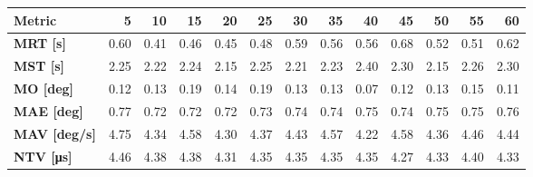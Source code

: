 \begin{tabular*}{\textwidth}{@{\extracolsep{\fill}}l|rrrrrrrrrrrr}
    \toprule
    \textbf{Metric} & \textbf{5} & \textbf{10} & \textbf{15} & \textbf{20} & \textbf{25} & \textbf{30} & \textbf{35} & \textbf{40} & \textbf{45} & \textbf{50} & \textbf{55} & \textbf{60} \\
    \midrule
    \textbf{MRT [s]} & 0.60 & 0.41 & 0.46 & 0.45 & 0.48 & 0.59 & 0.56 & 0.56 & 0.68 & 0.52 & 0.51 & 0.62 \\
    \textbf{MST [s]} & 2.25 & 2.22 & 2.24 & 2.15 & 2.25 & 2.21 & 2.23 & 2.40 & 2.30 & 2.15 & 2.26 & 2.30 \\
    \textbf{MO  [deg]} & 0.12 & 0.13 & 0.19 & 0.14 & 0.19 & 0.13 & 0.13 & 0.07 & 0.12 & 0.13 & 0.15 & 0.11 \\
    \textbf{MAE [deg]} & 0.77 & 0.72 & 0.72 & 0.72 & 0.73 & 0.74 & 0.74 & 0.75 & 0.74 & 0.75 & 0.75 & 0.76 \\
    \textbf{MAV [deg/s]} & 4.75 & 4.34 & 4.58 & 4.30 & 4.37 & 4.43 & 4.57 & 4.22 & 4.58 & 4.36 & 4.46 & 4.44 \\
    \textbf{NTV [\si{\micro\second}]} & 4.46 & 4.38 & 4.38 & 4.31 & 4.35 & 4.35 & 4.35 & 4.35 & 4.27 & 4.33 & 4.40 & 4.33 \\
    \bottomrule
\end{tabular*}

